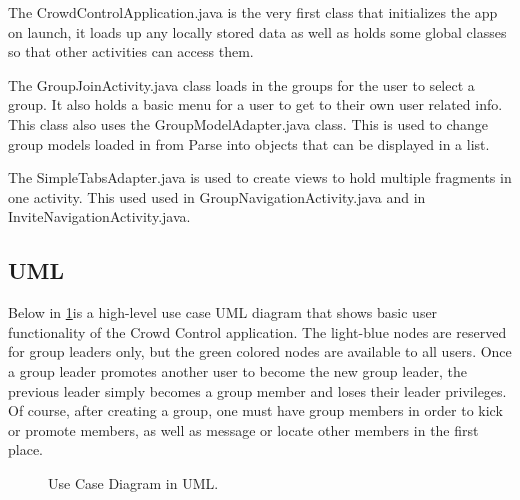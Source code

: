	The CrowdControlApplication.java is the very first class that initializes the app on launch, it loads up any locally stored data as well as holds some global classes so that other activities can access them.
	
	The GroupJoinActivity.java class loads in the groups for the user to select a group. It also holds a basic menu for a user to get to their own user related info. This class also uses the GroupModelAdapter.java class. This is used to change group models loaded in from Parse into objects that can be displayed in a list.
	
	The SimpleTabsAdapter.java is used to create views to hold multiple fragments in one activity. This used used in GroupNavigationActivity.java and in InviteNavigationActivity.java.

 \subsection{UML}
 Below in \ref{UseCaseUML}is a high-level use case UML diagram that shows basic user functionality of the Crowd Control application. The light-blue nodes are reserved for group leaders only, but the green colored nodes are available to all users. Once a group leader promotes another user to become the new group leader, the previous leader simply becomes a group member and loses their leader privileges. Of course, after creating a group, one must have group members in order to kick or promote members, as well as message or locate other members in the first place.
 
 	\begin{figure}[tbh!]
	\begin{center}
	\end{center}
	\caption{Use Case Diagram in UML. \label{UseCaseUML}}
	\end{figure}
 
